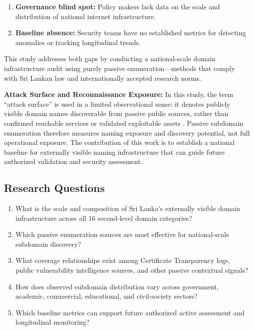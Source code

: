 \documentclass[preprint,review,12pt]{elsarticle}
\begin{document}
\begin{enumerate}
    \item \textbf{Governance blind spot:} Policy makers lack data on the scale and distribution of national internet infrastructure.
    \item \textbf{Baseline absence:} Security teams have no established metrics for detecting anomalies or tracking longitudinal trends.
\end{enumerate}

This study addresses both gaps by conducting a national-scale domain infrastructure audit using purely passive enumeration—methods that comply with Sri Lankan law and internationally accepted research norms.

\textbf{Attack Surface and Reconnaissance Exposure:} In this study, the term ``attack surface'' is used in a limited observational sense: it denotes publicly visible domain names discoverable from passive public sources, rather than confirmed reachable services or validated exploitable assets \cite{durumeric2013zmap,manadhata2011attack}. Passive subdomain enumeration therefore measures naming exposure and discovery potential, not full operational exposure. The contribution of this work is to establish a national baseline for externally visible naming infrastructure that can guide future authorized validation and security assessment.

\subsection{Research Questions}

\begin{enumerate}
    \item What is the scale and composition of Sri Lanka's externally visible domain infrastructure across all 16 second-level domain categories?
    \item Which passive enumeration sources are most effective for national-scale subdomain discovery?
    \item What coverage relationships exist among Certificate Transparency logs, public vulnerability intelligence sources, and other passive contextual signals?
    \item How does observed subdomain distribution vary across government, academic, commercial, educational, and civil-society sectors?
    \item Which baseline metrics can support future authorized active assessment and longitudinal monitoring?
\end{enumerate}
\end{document}
